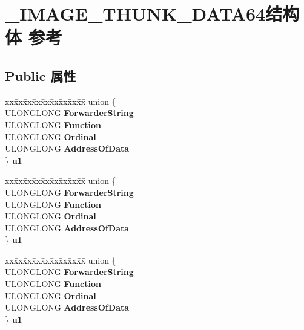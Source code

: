 \hypertarget{struct___i_m_a_g_e___t_h_u_n_k___d_a_t_a64}{}\section{\+\_\+\+I\+M\+A\+G\+E\+\_\+\+T\+H\+U\+N\+K\+\_\+\+D\+A\+T\+A64结构体 参考}
\label{struct___i_m_a_g_e___t_h_u_n_k___d_a_t_a64}
\subsection*{Public 属性}
\begin{DoxyCompactItemize}
\item 
\mbox{\label{struct___i_m_a_g_e___t_h_u_n_k___d_a_t_a64_a587ffea292883fd045a193aab00a0ef3}} 
\begin{tabbing}
xx\=xx\=xx\=xx\=xx\=xx\=xx\=xx\=xx\=\kill
union \{\\
\>ULONGLONG {\bfseries ForwarderString}\\
\>ULONGLONG {\bfseries Function}\\
\>ULONGLONG {\bfseries Ordinal}\\
\>ULONGLONG {\bfseries AddressOfData}\\
\} {\bfseries u1}\\

\end{tabbing}\item 
\mbox{\label{struct___i_m_a_g_e___t_h_u_n_k___d_a_t_a64_a625d7f688c36d53c2fa4659663adadd8}} 
\begin{tabbing}
xx\=xx\=xx\=xx\=xx\=xx\=xx\=xx\=xx\=\kill
union \{\\
\>ULONGLONG {\bfseries ForwarderString}\\
\>ULONGLONG {\bfseries Function}\\
\>ULONGLONG {\bfseries Ordinal}\\
\>ULONGLONG {\bfseries AddressOfData}\\
\} {\bfseries u1}\\

\end{tabbing}\item 
\mbox{\label{struct___i_m_a_g_e___t_h_u_n_k___d_a_t_a64_a8acf63ee10570ee16bd2ea7791c2af13}} 
\begin{tabbing}
xx\=xx\=xx\=xx\=xx\=xx\=xx\=xx\=xx\=\kill
union \{\\
\>ULONGLONG {\bfseries ForwarderString}\\
\>ULONGLONG {\bfseries Function}\\
\>ULONGLONG {\bfseries Ordinal}\\
\>ULONGLONG {\bfseries AddressOfData}\\
\} {\bfseries u1}\\

\end{tabbing}\end{DoxyCompactItemize}


